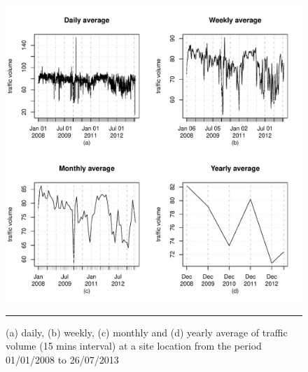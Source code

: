 \begin{figure}[htbp]
  \centering
    \includegraphics[width=\textwidth,height=\textheight,keepaspectratio]{Figures/averages.pdf}
    \rule{35em}{0.5pt}
  \caption[Average Traffic Volume]{(a) daily, (b) weekly, (c) monthly and (d) yearly average of
  traffic volume (15 mins interval) at a site location from the period 01/01/2008 to 26/07/2013}
  \label{fig:AverageTrafficVolume}
\end{figure}
